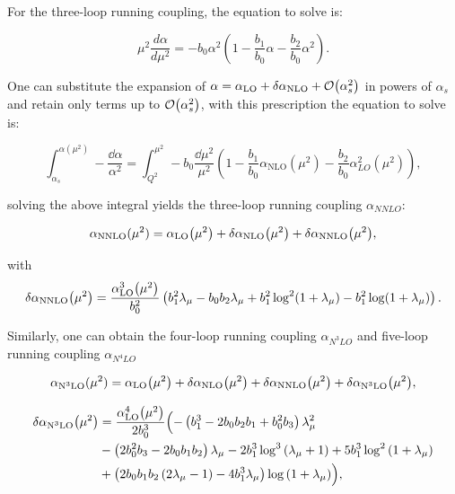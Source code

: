 \documentclass[../Tesi_Jiahao_Miao_986136.tex]{subfiles}
\begin{document}
For the three-loop running coupling, the equation to solve is:

\begin{equation}
    \mu^2 \frac{d\alpha}{d\mu^2} = - b_0 \alpha^2(1 - \frac{b_1}{b_0} \alpha - \frac{b_2}{b_0} \alpha^2).
\end{equation}

One can substitute the expansion of $\alpha= \alpha_{\text{LO}}+\delta\alpha_{\text{NLO}}+\order{\alpha_s^2}$ in powers of $\alpha_s$ 
and retain only terms up to $\order{\alpha_s^2}$, with this prescription the equation to solve is:

\begin{equation}
    \int_{\alpha_s}^{\alpha(\mu^2)} -\frac{\dd\alpha}{\alpha^2} = 
    \int _{Q^2}^{\mu^2} - b_0 \frac{ \dd\mu^2}{\mu^2} ( 1 - \frac{b_1}{b_0} \alpha_{\text{NLO}}(\mu^2) - \frac{b_2}{b_0} \alpha_{LO}^2(\mu^2) ),
\end{equation}

solving the above integral yields the three-loop running coupling $\alpha_{NNLO}$:

\begin{equation}\label{eq:NNLO}
    \alpha_{\text{NNLO}}(\mu^2) = \alpha_{\text{LO}}\qty(\mu^2) + \delta\alpha_{\text{NLO}}\qty(\mu^2)+\delta\alpha_{\text{NNLO}}\qty(\mu^2),
\end{equation}

with 
\begin{equation}\label{eq:DNNLO}
    \delta\alpha_{\text{NNLO}}\qty(\mu^2) = \frac{\alpha_{\text{LO}}^3\qty(\mu^2)}{b_0^2}\left(b _1^2 \lambda_\mu -b_0 b_2 \lambda_\mu +b_1^2 \log ^2(1+\lambda_\mu )-b_1^2 \log (1+\lambda_\mu )\right).
\end{equation}

Similarly, one can obtain the four-loop running coupling $\alpha_{N^3LO}$ and five-loop running coupling $\alpha_{N^4LO}$

\begin{equation}\label{eq:N3LO}
    \alpha_{\text{N}^3\text{LO}}(\mu^2) = \alpha_{\text{LO}}\qty(\mu^2) + \delta\alpha_{\text{NLO}}\qty(\mu^2)+\delta\alpha_{\text{NNLO}}\qty(\mu^2)+\delta\alpha_{\text{N}^3\text{LO}}\qty(\mu^2),
\end{equation}

\begin{equation}\label{eq:DN3LO}
    \begin{split}
        \delta\alpha_{\text{N}^3\text{LO}}\qty(\mu^2) &= \frac{\alpha_{\text{LO}}^4\qty(\mu^2)}{2 b_0^3} \Bigl(-\left(b_1^3-2 b_0 b_2 b_1+b_0^2 b_3\right) \lambda _{\mu }^2\\
        &-\left(2 b_0^2 b_3-2 b_0 b_1 b_2\right) \lambda _{\mu }-2 b_1^3 \log ^3\left(\lambda _{\mu }+1\right)+5 b_1^3 \log ^2\left(1+\lambda _{\mu }\right)\\
        &+\left(2 b_0 b_1 b_2 \left(2 \lambda _{\mu }-1\right)-4 b_1^3 \lambda _{\mu }\right) \log \left(1+\lambda _{\mu }\right)\Bigr),
    \end{split}
\end{equation}
\end{document}
